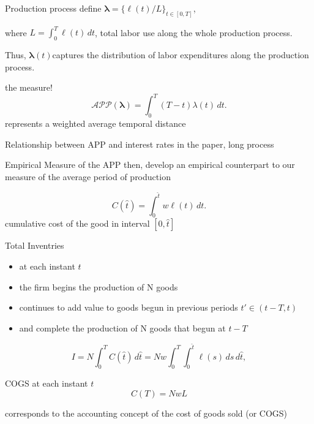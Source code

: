 \documentclass[aspectratio=1610]{beamer}
\begin{document}
\begin{frame}{Production process}
define $\boldsymbol{\lambda} = \{\ell(t)/L\}_{t\in[0,T]}$, 

\vspace{1cm}

where $L = \int_{0}^{T} \ell(t) \, dt$, total labor use along the whole production process.

\vspace{1cm}
Thus, $\boldsymbol{\lambda}(t)$captures the distribution of labor expenditures along the production process.

\end{frame}

\begin{frame}{the measure!}
$$\mathcal{APP}(\boldsymbol{\lambda}) = \int_{0}^{T} (T-t)\lambda(t) \, dt.$$
    represents a weighted average temporal distance
\end{frame}

\begin{frame}{Relationship between APP and interest rates}
in the paper, long process
    
\end{frame}


\begin{frame}{Empirical Measure of the APP}
then, develop an empirical counterpart to our measure of the average period of  production

\vspace{1cm}

$$C(\hat{t}) = \int_{0}^{\hat{t}} w\ell(t) \, dt.$$
cumulative cost of the good in interval $[0,\hat{t}]$
\end{frame}

\begin{frame}{Total Inventries}
\begin{itemize}
    \item at each instant $t$
    \item  the firm begins the production of N goods
    \item  continues to add value to goods begun in previous periods $t\prime \in(t-T,t) $
    \item and complete the production of N goods that begun at $t-T$
\end{itemize}

    $$I = N \int_{0}^{T} C(\hat{t}) \, d\hat{t} = Nw \int_{0}^{T} \int_{0}^{\hat{t}} \ell(s) \, ds \, d\hat{t},$$
\end{frame}

\begin{frame}{COGS}
at each instant $t$
$$C(T)=NwL$$

corresponds to the accounting concept of the cost of goods sold (or COGS)
\end{frame}
\end{document}
